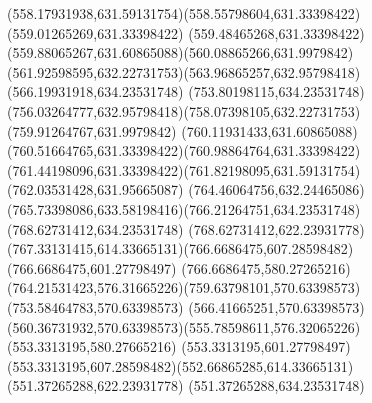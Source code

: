 {{\curveto(558.17931938,631.59131754)(558.55798604,631.33398422)(559.01265269,631.33398422)
\curveto(559.48465268,631.33398422)(559.88065267,631.60865088)(560.08865266,631.9979842)
\curveto(561.92598595,632.22731753)(563.96865257,632.95798418)(566.19931918,634.23531748)
\lineto(753.80198115,634.23531748)
\curveto(756.03264777,632.95798418)(758.07398105,632.22731753)(759.91264767,631.9979842)
\curveto(760.11931433,631.60865088)(760.51664765,631.33398422)(760.98864764,631.33398422)
\curveto(761.44198096,631.33398422)(761.82198095,631.59131754)(762.03531428,631.95665087)
\curveto(764.46064756,632.24465086)(765.73398086,633.58198416)(766.21264751,634.23531748)
\lineto(768.62731412,634.23531748)
\lineto(768.62731412,622.23931778)
\curveto(767.33131415,614.33665131)(766.6686475,607.28598482)(766.6686475,601.27798497)
\lineto(766.6686475,580.27265216)
\curveto(764.21531423,576.31665226)(759.63798101,570.63398573)(753.58464783,570.63398573)
\lineto(566.41665251,570.63398573)
\curveto(560.36731932,570.63398573)(555.78598611,576.32065226)(553.3313195,580.27665216)
\lineto(553.3313195,601.27798497)
\curveto(553.3313195,607.28598482)(552.66865285,614.33665131)(551.37265288,622.23931778)
\lineto(551.37265288,634.23531748)
\closepath
}
}